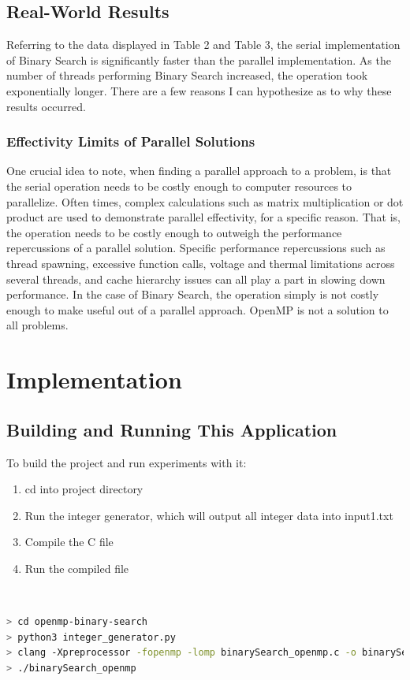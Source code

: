 \documentclass[fleqn,10pt]{wlscirep}
\begin{document}
\subsection*{Real-World Results}
Referring to the data displayed in Table 2 and Table 3, the serial implementation of Binary Search is significantly faster than the parallel implementation. As the number of threads performing Binary Search increased, the operation took exponentially longer. There are a few reasons I can hypothesize as to why these results occurred.

\subsubsection*{Effectivity Limits of Parallel Solutions}
One crucial idea to note, when finding a parallel approach to a problem, is that the serial operation needs to be costly enough to computer resources to parallelize. Often times, complex calculations such as matrix multiplication or dot product are used to demonstrate parallel effectivity, for a specific reason. That is, the operation needs to be costly enough to outweigh the performance repercussions of a parallel solution. Specific performance repercussions such as thread spawning, excessive function calls, voltage and thermal limitations across several threads, and cache hierarchy issues can all play a part in slowing down performance. In the case of Binary Search, the operation simply is not costly enough to make useful out of a parallel approach. OpenMP is not a solution to all problems.



\section{Implementation}
\subsection*{Building and Running This Application}
To build the project and run experiments with it:
\begin{enumerate}
  \item cd into project directory
  \item Run the integer generator, which will output all integer data into input1.txt
  \item Compile the C file
  \item Run the compiled file
\end{enumerate}
\\
\begin{lstlisting}[language=bash]
> cd openmp-binary-search
> python3 integer_generator.py
> clang -Xpreprocessor -fopenmp -lomp binarySearch_openmp.c -o binarySearch_openmp
> ./binarySearch_openmp
\end{lstlisting}
\end{document}
